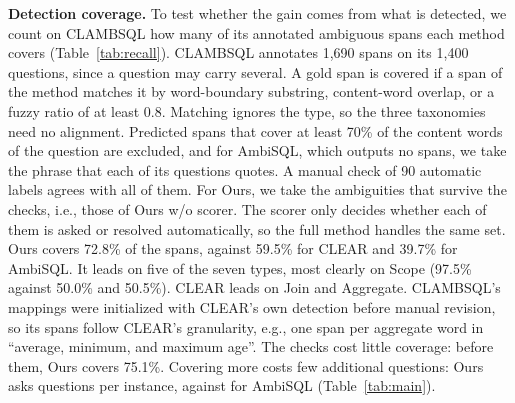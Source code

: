 \textbf{Detection coverage.} To test whether the gain comes from what
is detected, we count on CLAMBSQL how many of its annotated ambiguous
spans each method covers (Table~\ref{tab:recall}). CLAMBSQL annotates 1{,}690 spans on its
1{,}400 questions, since a question may carry several. A gold span is
covered if a span of the method matches it by word-boundary substring,
content-word overlap, or a fuzzy ratio of at least 0.8. Matching
ignores the type, so the three taxonomies need no alignment. Predicted
spans that cover at least 70\% of the content words of the question
are excluded, and for AmbiSQL, which outputs no spans, we take the
phrase that each of its questions quotes. A manual check of 90
automatic labels agrees with all of them. For Ours,
we take the ambiguities that survive the checks, i.e., those of Ours
w/o scorer. The scorer only decides whether each of them is asked or
resolved automatically, so the full method handles the same set.
Ours covers 72.8\% of the spans,
against 59.5\% for CLEAR and 39.7\% for AmbiSQL. It leads on five of
the seven types, most clearly on Scope (97.5\% against 50.0\% and
50.5\%).
CLEAR leads on Join and Aggregate. CLAMBSQL's mappings were initialized
with CLEAR's own detection before manual revision, so its spans follow
CLEAR's granularity, e.g., one span per aggregate word in ``average,
minimum, and maximum age''. The checks cost little coverage: before
them, Ours covers 75.1\%. Covering more costs few additional
questions: Ours asks \abQClambsqlJevAsk{} questions per instance,
against \qTabClambsqlAmbiSql{} for AmbiSQL (Table~\ref{tab:main}).

